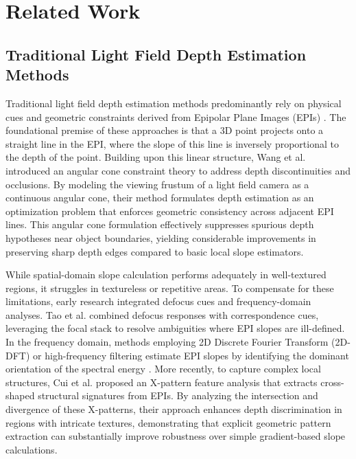 \section{Related Work}

\subsection{Traditional Light Field Depth Estimation Methods}

Traditional light field depth estimation methods predominantly rely on physical cues and geometric constraints derived from Epipolar Plane Images (EPIs) . The foundational premise of these approaches is that a 3D point projects onto a straight line in the EPI, where the slope of this line is inversely proportional to the depth of the point. Building upon this linear structure, Wang et al. introduced an angular cone constraint theory to address depth discontinuities and occlusions. By modeling the viewing frustum of a light field camera as a continuous angular cone, their method formulates depth estimation as an optimization problem that enforces geometric consistency across adjacent EPI lines. This angular cone formulation effectively suppresses spurious depth hypotheses near object boundaries, yielding considerable improvements in preserving sharp depth edges compared to basic local slope estimators.

While spatial-domain slope calculation performs adequately in well-textured regions, it struggles in textureless or repetitive areas. To compensate for these limitations, early research integrated defocus cues and frequency-domain analyses. Tao et al. combined defocus responses with correspondence cues, leveraging the focal stack to resolve ambiguities where EPI slopes are ill-defined. In the frequency domain, methods employing 2D Discrete Fourier Transform (2D-DFT) or high-frequency filtering estimate EPI slopes by identifying the dominant orientation of the spectral energy . More recently, to capture complex local structures, Cui et al. proposed an X-pattern feature analysis that extracts cross-shaped structural signatures from EPIs. By analyzing the intersection and divergence of these X-patterns, their approach enhances depth discrimination in regions with intricate textures, demonstrating that explicit geometric pattern extraction can substantially improve robustness over simple gradient-based slope calculations.

